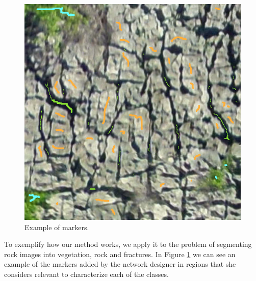 \documentclass[10pt,twocolumn,letterpaper]{article}
\begin{document}
\begin{figure}[t]
  \begin{center}
     \includegraphics[width=0.8\linewidth]{figures/tile0705-markers.png}
  \end{center}
     \caption{Example of markers.}
  \label{fig:ex-markers}
\end{figure}

To exemplify how our method works, we apply it to the problem of segmenting rock images into vegetation, rock and fractures. In Figure \ref{fig:ex-markers} we can see an example of the markers added by the network designer in regions that she considers relevant to characterize each of the classes.
\end{document}
